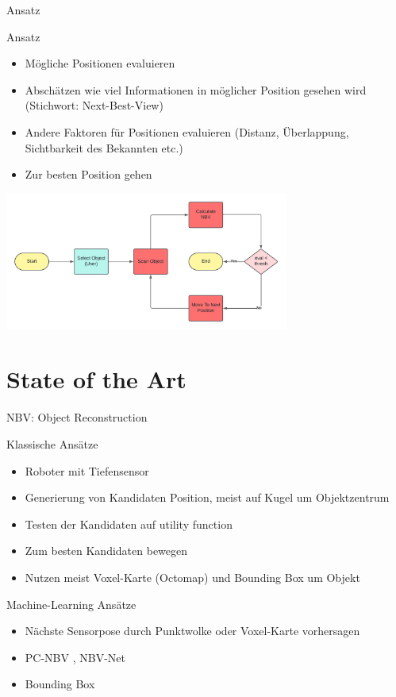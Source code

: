 \documentclass{beamer}
\begin{document}
\begin{frame}{Ansatz}
	\begin{block}{Ansatz}
		\begin{itemize}
			\item Mögliche Positionen evaluieren
			\item Abschätzen wie viel Informationen in möglicher Position gesehen wird (Stichwort: Next-Best-View)
			\item Andere Faktoren für Positionen evaluieren (Distanz, Überlappung, Sichtbarkeit des Bekannten etc.)
			\item Zur besten Position gehen
		\end{itemize}
	\end{block}
	\begin{center}
		\includegraphics[width=0.7\textwidth]{Graphics/flow_chart.png}
	\end{center}
\end{frame}

\section{State of the Art}
\begin{frame}{NBV: Object Reconstruction}
	\begin{block}{Klassische Ansätze}
		\begin{itemize}
			\item Roboter mit Tiefensensor
			\item Generierung von Kandidaten Position, meist auf Kugel um Objektzentrum
			\item Testen der Kandidaten auf utility function
			\item Zum besten Kandidaten bewegen
			\item Nutzen meist Voxel-Karte (Octomap) und Bounding Box um Objekt
		\end{itemize}
		\cite{zeng_view_2020}
	\end{block}
	\begin{exampleblock}{Machine-Learning Ansätze}
		\begin{itemize}
			\item Nächste Sensorpose durch Punktwolke oder Voxel-Karte vorhersagen
			\item PC-NBV \cite{zeng_pc-nbv_2020}, NBV-Net \cite{mendoza_supervised_2020}
			\item Bounding Box
		\end{itemize}
	\end{exampleblock}
\end{frame}
\end{document}
